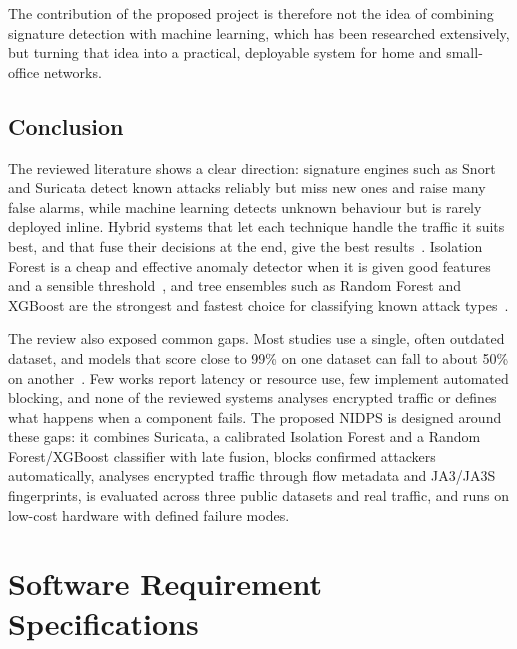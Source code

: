 \noindent The contribution of the proposed project is therefore not the idea of combining signature detection with machine learning, which has been researched extensively, but turning that idea into a practical, deployable system for home and small-office networks.

\section{Conclusion}\label{sec:3.6}

\noindent The reviewed literature shows a clear direction: signature engines such as Snort and Suricata detect known attacks reliably but miss new ones and raise many false alarms, while machine learning detects unknown behaviour but is rarely deployed inline. Hybrid systems that let each technique handle the traffic it suits best, and that fuse their decisions at the end, give the best results~\cite{lr:kim2014,lr:wenudeoji2025,lr:naik2025}. Isolation Forest is a cheap and effective anomaly detector when it is given good features and a sensible threshold~\cite{lr:moomtaheen2024,lr:yu2024,lr:feng2022}, and tree ensembles such as Random Forest and XGBoost are the strongest and fastest choice for classifying known attack types~\cite{lr:ajagbe2024,lr:more2024,lr:almahaqeri2026}.

\noindent The review also exposed common gaps. Most studies use a single, often outdated dataset, and models that score close to 99\% on one dataset can fall to about 50\% on another~\cite{lr:xin2025}. Few works report latency or resource use, few implement automated blocking, and none of the reviewed systems analyses encrypted traffic or defines what happens when a component fails. The proposed NIDPS is designed around these gaps: it combines Suricata, a calibrated Isolation Forest and a Random Forest/XGBoost classifier with late fusion, blocks confirmed attackers automatically, analyses encrypted traffic through flow metadata and JA3/JA3S fingerprints, is evaluated across three public datasets and real traffic, and runs on low-cost hardware with defined failure modes.

\chapter{Software Requirement Specifications}\label{chap:4}

